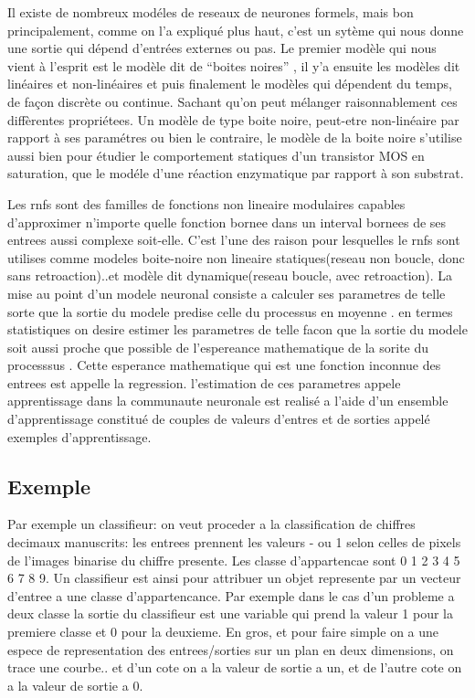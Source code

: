 \documentclass[a4paper,12pt]{report}
\begin{document}
Il existe de nombreux mod\'eles de reseaux de neurones formels, mais
bon principalement, comme on l'a expliqu\'e plus haut, c'est un
syt\`eme qui nous donne une sortie qui d\'epend d'entr\'ees externes
ou pas. Le premier mod\`ele qui nous vient \`a l'esprit est le
mod\`ele dit de ``boites noires'' , il y'a ensuite les mod\`eles dit
lin\'eaires et non-lin\'eaires et puis finalement le mod\`eles qui
d\'ependent du temps, de fa\c con discr\`ete ou continue. Sachant
qu'on peut m\'elanger raisonnablement ces diff\`erentes propri\'etees.
Un mod\`ele de type boite noire, peut-etre non-lin\'eaire par rapport
\`a ses param\'etres ou bien le contraire, le mod\`ele de la boite
noire s'utilise aussi bien pour \'etudier le comportement statiques
d'un transistor MOS en saturation, que le mod\'ele d'une r\'eaction
enzymatique par rapport \`a son substrat.

Les rnfs sont des familles de fonctions non lineaire modulaires
capables d'approximer n'importe quelle fonction bornee dans un
interval bornees de ses entrees aussi complexe soit-elle. C'est l'une
des raison pour lesquelles le rnfs sont utilises comme modeles
boite-noire non lineaire statiques(reseau non boucle, donc sans
retroaction)..et mod\`ele dit dynamique(reseau boucle, avec
retroaction). La mise au point d'un modele neuronal consiste a
calculer ses parametres de telle sorte que la sortie du modele predise
celle du processus en moyenne . en termes statistiques on desire
estimer les parametres de telle facon que la sortie du modele soit
aussi proche que possible de l'espereance mathematique de la sorite
du processsus . Cette esperance mathematique qui est une fonction
inconnue des entrees est appelle la regression. l'estimation de
ces parametres appele apprentissage dans la communaute neuronale est
realis\'e  a l'aide d'un ensemble d'apprentissage constitu\'e de couples
de valeurs d'entres et de sorties appel\'e exemples d'apprentissage.

\subsection{Exemple}
Par exemple un classifieur: on veut proceder a la classification de
chiffres decimaux manuscrits: les entrees prennent les valeurs - ou 1
selon celles de pixels de l'images binarise du chiffre presente. Les
classe d'appartencae sont {0 1 2 3 4 5 6 7 8 9}.
Un classifieur est ainsi pour attribuer un objet represente par
un vecteur d'entree a une classe d'appartencance. Par exemple dans le
cas d'un probleme a deux classe la sortie du classifieur est une
variable qui prend la valeur 1 pour la premiere classe et 0 pour la
deuxieme.
En gros, et pour faire simple on a une espece de representation des
entrees/sorties sur un plan en deux dimensions, on trace une
courbe.. et d'un cote on a la valeur de sortie a un, et de l'autre
cote on a la valeur de sortie a 0.
\end{document}
